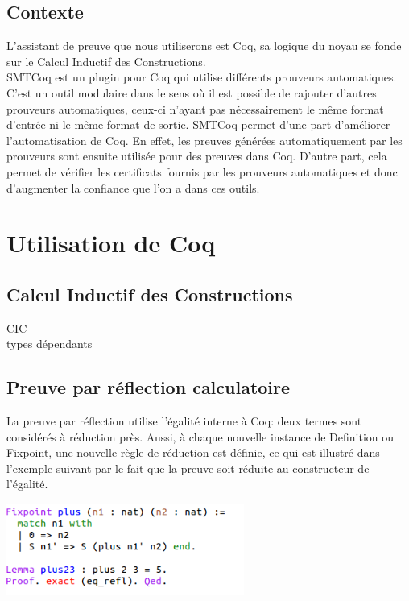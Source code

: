 \documentclass{article}
\begin{document}
\subsection{Contexte}

L'assistant de preuve que nous utiliserons est Coq, sa logique du noyau se fonde sur le Calcul Inductif des Constructions. \\

SMTCoq est un plugin pour Coq qui utilise différents prouveurs automatiques. C'est un outil modulaire dans le sens où il est possible de rajouter d'autres prouveurs automatiques, ceux-ci n'ayant pas nécessairement le même format d'entrée ni le même format de sortie. SMTCoq permet d'une part d'améliorer l'automatisation de Coq. En effet, les preuves générées automatiquement par les prouveurs sont ensuite utilisée pour des preuves dans Coq. D'autre part, cela permet de vérifier les certificats fournis par les prouveurs automatiques et donc d'augmenter la confiance que l'on a dans ces outils.


\section{Utilisation de Coq}

\subsection{Calcul Inductif des Constructions}

CIC \\
types dépendants

\subsection{Preuve par réflection calculatoire}

La preuve par réflection utilise l'égalité interne à Coq: deux termes sont considérés à réduction près. 
Aussi, à chaque nouvelle instance de Definition ou Fixpoint, une nouvelle règle de réduction est définie, ce qui est illustré dans l'exemple suivant par le fait que la preuve soit réduite au constructeur de l'égalité.

\begin{center}
    \includegraphics[height = 3cm]{refl.png}
\end{center}
\end{document}
